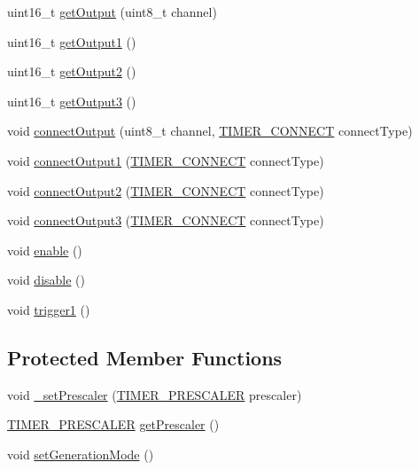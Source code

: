 \begin{DoxyCompactItemize}
\item 
uint16\-\_\-t \hyperlink{classmhvlib_1_1_timer_implementation_a69562dc2a6df1396f52228fa9fcb740a}{get\-Output} (uint8\-\_\-t channel)
\item 
uint16\-\_\-t \hyperlink{classmhvlib_1_1_timer_implementation_a907104d55aca56718aae6991862a5a94}{get\-Output1} ()
\item 
uint16\-\_\-t \hyperlink{classmhvlib_1_1_timer_implementation_abc2ce51acda9f71c9aa8465f07cafb6e}{get\-Output2} ()
\item 
uint16\-\_\-t \hyperlink{classmhvlib_1_1_timer_implementation_a21da6ee07ec7f23ffe7c736e4ec87a88}{get\-Output3} ()
\item 
void \hyperlink{classmhvlib_1_1_timer_implementation_a5efd6b56f6a5a26747a266681315db0c}{connect\-Output} (uint8\-\_\-t channel, \hyperlink{namespacemhvlib_a670ebf781e5447de855e589e9100e224}{T\-I\-M\-E\-R\-\_\-\-C\-O\-N\-N\-E\-C\-T} connect\-Type)
\item 
void \hyperlink{classmhvlib_1_1_timer_implementation_aed9ab5334055ccc676266651649d03d6}{connect\-Output1} (\hyperlink{namespacemhvlib_a670ebf781e5447de855e589e9100e224}{T\-I\-M\-E\-R\-\_\-\-C\-O\-N\-N\-E\-C\-T} connect\-Type)
\item 
void \hyperlink{classmhvlib_1_1_timer_implementation_a51a0667fa6e6de6cb4bc1f8e6d7a9747}{connect\-Output2} (\hyperlink{namespacemhvlib_a670ebf781e5447de855e589e9100e224}{T\-I\-M\-E\-R\-\_\-\-C\-O\-N\-N\-E\-C\-T} connect\-Type)
\item 
void \hyperlink{classmhvlib_1_1_timer_implementation_a1542d756ee3d1573f98e19c8b153a10c}{connect\-Output3} (\hyperlink{namespacemhvlib_a670ebf781e5447de855e589e9100e224}{T\-I\-M\-E\-R\-\_\-\-C\-O\-N\-N\-E\-C\-T} connect\-Type)
\item 
void \hyperlink{classmhvlib_1_1_timer_implementation_a56d91998c31cab9618b4d58c0d42f499}{enable} ()
\item 
void \hyperlink{classmhvlib_1_1_timer_implementation_aaa3b47cdecd9b209074a77edbd878246}{disable} ()
\item 
void \hyperlink{classmhvlib_1_1_timer_implementation_afe4a733b13273676907a765419efd6e3}{trigger1} ()
\end{DoxyCompactItemize}
\subsection*{Protected Member Functions}
\begin{DoxyCompactItemize}
\item 
void \hyperlink{classmhvlib_1_1_timer_implementation_aee518bdfdb49046366b9e0afb27bd8d6}{\-\_\-set\-Prescaler} (\hyperlink{namespacemhvlib_ae280d2a7103fc576dbd0e8880c574e6c}{T\-I\-M\-E\-R\-\_\-\-P\-R\-E\-S\-C\-A\-L\-E\-R} prescaler)
\item 
\hyperlink{namespacemhvlib_ae280d2a7103fc576dbd0e8880c574e6c}{T\-I\-M\-E\-R\-\_\-\-P\-R\-E\-S\-C\-A\-L\-E\-R} \hyperlink{classmhvlib_1_1_timer_implementation_a331190b1a3f175dc53910ef1e0f99224}{get\-Prescaler} ()
\item 
void \hyperlink{classmhvlib_1_1_timer_implementation_a2d71ce0874281bffc8ea9707f6842f4b}{set\-Generation\-Mode} ()
\end{DoxyCompactItemize}
